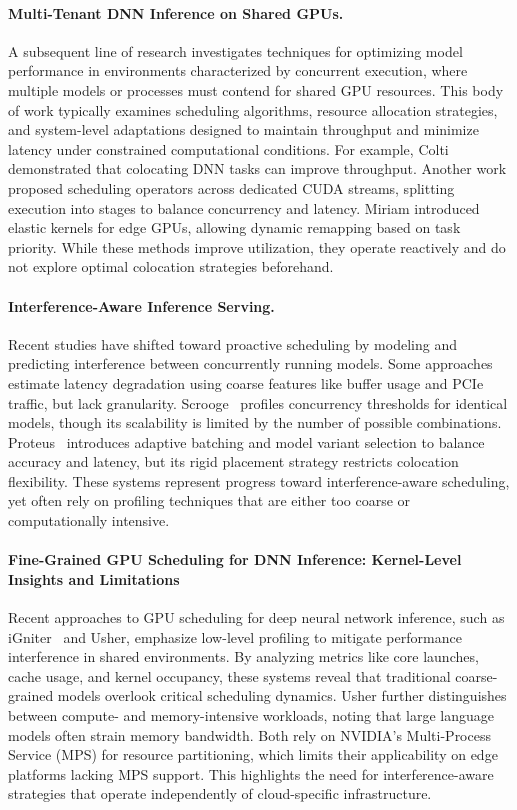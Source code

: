 \paragraph{Multi-Tenant DNN Inference on Shared GPUs.}
A subsequent line of research investigates techniques for optimizing model performance in environments characterized by concurrent execution, where multiple models or processes must contend for shared GPU resources. This body of work typically examines scheduling algorithms, resource allocation strategies, and system-level adaptations designed to maintain throughput and minimize latency under constrained computational conditions. For example, Colti demonstrated that colocating DNN tasks can improve throughput. Another work proposed scheduling operators across dedicated CUDA streams, splitting execution into stages to balance concurrency and latency. Miriam introduced elastic kernels for edge GPUs, allowing dynamic remapping based on task priority. While these methods improve utilization, they operate reactively and do not explore optimal colocation strategies beforehand.

\paragraph{Interference-Aware Inference Serving.}
Recent studies have shifted toward proactive scheduling by modeling and predicting interference between concurrently running models. Some approaches estimate latency degradation using coarse features like buffer usage and PCIe traffic, but lack granularity. Scrooge~\cite{hu2021scrooge} profiles concurrency thresholds for identical models, though its scalability is limited by the number of possible combinations. Proteus~\cite{ahmad2024proteus} introduces adaptive batching and model variant selection to balance accuracy and latency, but its rigid placement strategy restricts colocation flexibility. These systems represent progress toward interference-aware scheduling, yet often rely on profiling techniques that are either too coarse or computationally intensive.

\paragraph{Fine-Grained GPU Scheduling for DNN Inference: Kernel-Level Insights and Limitations}
Recent approaches to GPU scheduling for deep neural network inference, such as iGniter~\cite{xu2022igniter} and Usher, emphasize low-level profiling to mitigate performance interference in shared environments. By analyzing metrics like core launches, cache usage, and kernel occupancy, these systems reveal that traditional coarse-grained models overlook critical scheduling dynamics. Usher further distinguishes between compute- and memory-intensive workloads, noting that large language models often strain memory bandwidth. Both rely on NVIDIA's Multi-Process Service (MPS) for resource partitioning, which limits their applicability on edge platforms lacking MPS support. This highlights the need for interference-aware strategies that operate independently of cloud-specific infrastructure.

